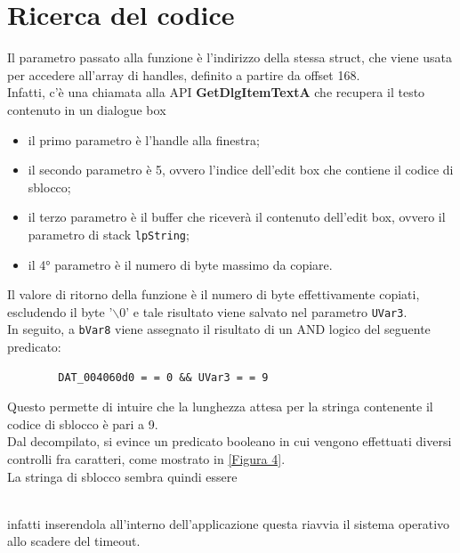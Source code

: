 \documentclass[12pt]{extarticle}
\begin{document}
\section{Ricerca del codice}
Il parametro passato alla funzione è l'indirizzo della stessa struct, che viene usata per accedere all'array di handles, definito a partire da offset 168.\\Infatti, c'è una chiamata alla API \textbf{GetDlgItemTextA} che recupera il testo contenuto in un dialogue box
\begin{itemize}
\item il primo parametro è l'handle alla finestra;
\item il secondo parametro è 5, ovvero l'indice dell'edit box che contiene il codice di sblocco;
\item il terzo parametro è il buffer che riceverà il contenuto dell'edit box, ovvero il parametro di stack \texttt{lpString};
\item il 4° parametro è il numero di byte massimo da copiare.
\end{itemize}
Il valore di ritorno della funzione è il numero di byte effettivamente copiati, escludendo il byte '$\backslash$0' e tale risultato viene salvato nel parametro \texttt{UVar3}.\\In seguito, a \texttt{bVar8} viene assegnato il risultato di un AND logico del seguente predicato:
\begin{lstlisting}
		DAT_004060d0 = = 0 && UVar3 = = 9
\end{lstlisting}
Questo permette di intuire che la lunghezza attesa per la stringa contenente il codice di sblocco è pari a 9.\\ Dal decompilato, si evince un predicato booleano in cui vengono effettuati diversi controlli fra caratteri, come mostrato in \ref{Figura 4}.\\La stringa di sblocco sembra quindi essere\\
\centerline{ 
%
}
\\infatti inserendola all'interno dell'applicazione questa riavvia il sistema operativo allo scadere del timeout.
\end{document}
